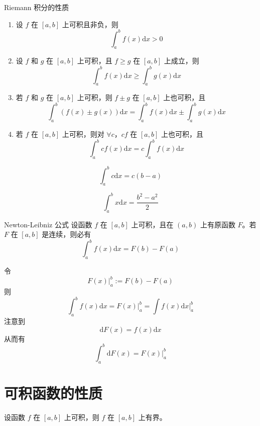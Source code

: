 \begin{theorem}{Riemann 积分的性质}
    \begin{enumerate}
        \item 设 $f$ 在 $[a, b]$ 上可积且非负，则
              \[\int_a^b f(x)\mathrm{d}x > 0\]
        \item 设 $f$ 和 $g$ 在 $[a, b]$ 上可积，且 $f \geqslant g$ 在 $[a, b]$ 上成立，则
              \[\int_a^b f(x)\mathrm{d}x \geqslant \int_a^b g(x)\mathrm{d}x\]
        \item 若 $f$ 和 $g$ 在 $[a, b]$ 上可积，则 $f \pm g$ 在 $[a, b]$ 上也可积，且
              \[\int_a^b(f(x)\pm g(x))\mathrm{d}x = \int_a^b f(x)\mathrm{d}x \pm \int_a^b g(x)\mathrm{d}x\]
        \item 若 $f$ 在 $[a, b]$ 上可积，则对 $\forall c$，$cf$ 在 $[a, b]$ 上也可积，且
              \[\int_a^b cf(x)\mathrm{d}x = c\int_{a}^{b} f(x)\mathrm{d}x\]
    \end{enumerate}
\end{theorem}

\hfill

\begin{example}
    \[\int_{a}^{b} c \mathrm{d}x = c(b - a)\]
\end{example}

\hfill

\begin{example}
    \[\int_{a}^{b} x \mathrm{d}x = \frac{b^2 - a^2}{2}\]
\end{example}

\begin{theorem}{Newton-Leibniz 公式}
    设函数 $f$ 在 $[a, b]$ 上可积，且在 $(a, b)$ 上有原函数 $F$。若 $F$ 在 $[a, b]$ 是连续，则必有
    \[\int_{a}^{b} f(x) \mathrm{d}x = F(b) - F(a)\]
\end{theorem}
令
\[F(x)\bigg|_a^b := F(b) - F(a)\]
则
\[\int_a^b f(x)\mathrm{d}x = F(x)\bigg|_a^b = \int f(x)\mathrm{d}x\bigg|_a^b\]
注意到
\[\mathrm{d}F(x) = f(x)\mathrm{d}x\]
从而有
\[\int_a^b \mathrm{d}F(x) = F(x)\bigg|_a^b\]


\section{可积函数的性质}

\begin{theorem}
    设函数 $f$ 在 $[a, b]$ 上可积，则 $f$ 在 $[a, b]$ 上有界。
\end{theorem}

